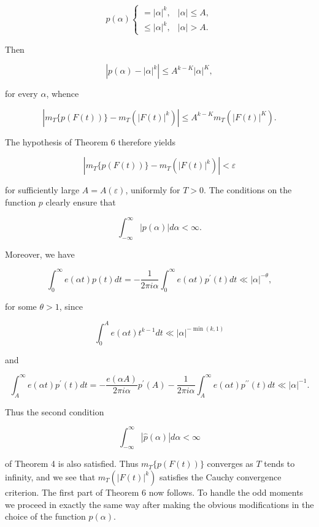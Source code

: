 \documentclass[10pt]{article}
\begin{document}
$$
p(\alpha) \begin{cases}=|\alpha|^{k}, & |\alpha| \leq A, \\ \leq|\alpha|^{k}, & |\alpha|>A .\end{cases}
$$

Then

$$
\left|p(\alpha)-|\alpha|^{k}\right| \leq A^{k-K}|\alpha|^{K},
$$

for every $\alpha$, whence

$$
\left|m_{T}\{p(F(t))\}-m_{T}\left(|F(t)|^{k}\right)\right| \leq A^{k-K} m_{T}\left(|F(t)|^{K}\right) .
$$

The hypothesis of Theorem 6 therefore yields

$$
\left|m_{T}\{p(F(t))\}-m_{T}\left(|F(t)|^{k}\right)\right|<\varepsilon
$$

for sufficiently large $A=A(\varepsilon)$, uniformly for $T>0$. The conditions on the function $p$ clearly ensure that

$$
\int_{-\infty}^{\infty}|p(\alpha)| d \alpha<\infty .
$$

Moreover, we have

$$
\int_{0}^{\infty} e(\alpha t) p(t) d t=-\frac{1}{2 \pi i \alpha} \int_{0}^{\infty} e(\alpha t) p^{\prime}(t) d t \ll|\alpha|^{-\theta},
$$

for some $\theta>1$, since

$$
\int_{0}^{A} e(\alpha t) t^{k-1} d t \ll|\alpha|^{-\min(k,1)}
$$

and

$$
\int_{A}^{\infty} e(\alpha t) p^{\prime}(t) d t=-\frac{e(\alpha A)}{2 \pi i \alpha} p^{\prime}(A)-\frac{1}{2 \pi i \alpha} \int_{A}^{\infty} e(\alpha t) p^{\prime \prime}(t) d t \ll|\alpha|^{-1} .
$$

Thus the second condition

$$
\int_{-\infty}^{\infty}|\widehat{p}(\alpha)| d \alpha<\infty
$$

of Theorem 4 is also satisfied. Thus $m_{T}\{p(F(t))\}$ converges as $T$ tends to infinity, and we see that $m_{T}\left(|F(t)|^{k}\right)$ satisfies the Cauchy convergence criterion. The first part of Theorem 6 now follows. To handle the odd moments we proceed in exactly the same way after making the obvious modifications in the choice of the function $p(\alpha)$.
\end{document}
